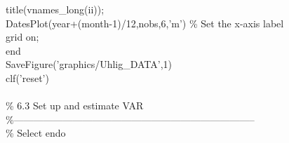 \hspace{1mm}\hspace{5mm} \hspace{5mm} \hspace{5mm} title(vnames\_long(ii));  \\ 
\hspace{1mm}\hspace{5mm} \hspace{5mm} \hspace{5mm} DatesPlot(year+(month-1)/12,nobs,6,\textcolor{matlabpurple}{'m'}) \textcolor{matlabgreen}{\% Set the x-axis label  }\\ 
\hspace{1mm}\hspace{5mm} \hspace{5mm} \hspace{5mm} grid on;  \\ 
\hspace{1mm}\hspace{5mm} \hspace{5mm} \textcolor{matlabblue}{end} \\ 
\hspace{1mm}\hspace{5mm} \hspace{5mm} SaveFigure(\textcolor{matlabpurple}{'graphics/Uhlig\_DATA'},1) \\ 
\hspace{1mm}\hspace{5mm} \hspace{5mm} clf(\textcolor{matlabpurple}{'reset'}) \\ 
\hspace{1mm}\hspace{5mm} \hspace{5mm}  \\ 
\hspace{1mm}\hspace{5mm} \hspace{5mm} \textcolor{matlabgreen}{\% 6.3 Set up and estimate VAR }\\ 
\hspace{1mm}\hspace{5mm} \hspace{5mm} \textcolor{matlabgreen}{\%--------------------------------------------------------------------------  }\\ 
\hspace{1mm}\hspace{5mm} \hspace{5mm} \textcolor{matlabgreen}{\% Select endo }\\ 
